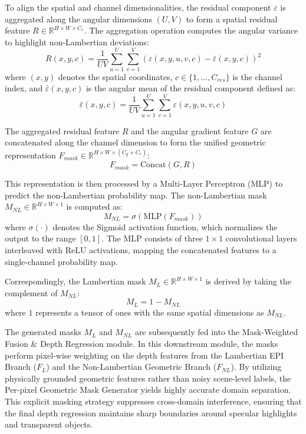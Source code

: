 To align the spatial and channel dimensionalities, the residual component $\varepsilon$ is aggregated along the angular dimensions $(U, V)$ to form a spatial residual feature $R \in \mathbb{R}^{H \times W \times C_r}$. The aggregation operation computes the angular variance to highlight non-Lambertian deviations:
\begin{equation}
\label{eq:eq16}
R(x,y,c) = \frac{1}{UV} \sum_{u=1}^{U} \sum_{v=1}^{V} \left( \varepsilon(x,y,u,v,c) - \bar{\varepsilon}(x,y,c) \right)^2
\end{equation}
where $(x,y)$ denotes the spatial coordinates, $c \in \{1, \dots, C_{res}\}$ is the channel index, and $\bar{\varepsilon}(x,y,c)$ is the angular mean of the residual component defined as:
\begin{equation}
\label{eq:eq17}
\bar{\varepsilon}(x,y,c) = \frac{1}{UV} \sum_{u=1}^{U} \sum_{v=1}^{V} \varepsilon(x,y,u,v,c)
\end{equation}

The aggregated residual feature $R$ and the angular gradient feature $G$ are concatenated along the channel dimension to form the unified geometric representation $F_{mask} \in \mathbb{R}^{H \times W \times (C_g + C_r)}$:
\begin{equation}
\label{eq:eq18}
F_{mask} = \text{Concat}(G, R)
\end{equation}

This representation is then processed by a Multi-Layer Perceptron (MLP) to predict the non-Lambertian probability map. The non-Lambertian mask $M_{NL} \in \mathbb{R}^{H \times W \times 1}$ is computed as:
\begin{equation}
\label{eq:eq19}
M_{NL} = \sigma(\text{MLP}(F_{mask}))
\end{equation}
where $\sigma(\cdot)$ denotes the Sigmoid activation function, which normalizes the output to the range $[0, 1]$. The MLP consists of three $1 \times 1$ convolutional layers interleaved with ReLU activations, mapping the concatenated features to a single-channel probability map.

Correspondingly, the Lambertian mask $M_L \in \mathbb{R}^{H \times W \times 1}$ is derived by taking the complement of $M_{NL}$:
\begin{equation}
\label{eq:eq20}
M_L = 1 - M_{NL}
\end{equation}
where $1$ represents a tensor of ones with the same spatial dimensions as $M_{NL}$.

The generated masks $M_L$ and $M_{NL}$ are subsequently fed into the Mask-Weighted Fusion \& Depth Regression module. In this downstream module, the masks perform pixel-wise weighting on the depth features from the Lambertian EPI Branch ($F_L$) and the Non-Lambertian Geometric Branch ($F_{NL}$). By utilizing physically grounded geometric features rather than noisy scene-level labels, the Per-pixel Geometric Mask Generator yields highly accurate domain separation. This explicit masking strategy suppresses cross-domain interference, ensuring that the final depth regression maintains sharp boundaries around specular highlights and transparent objects.


